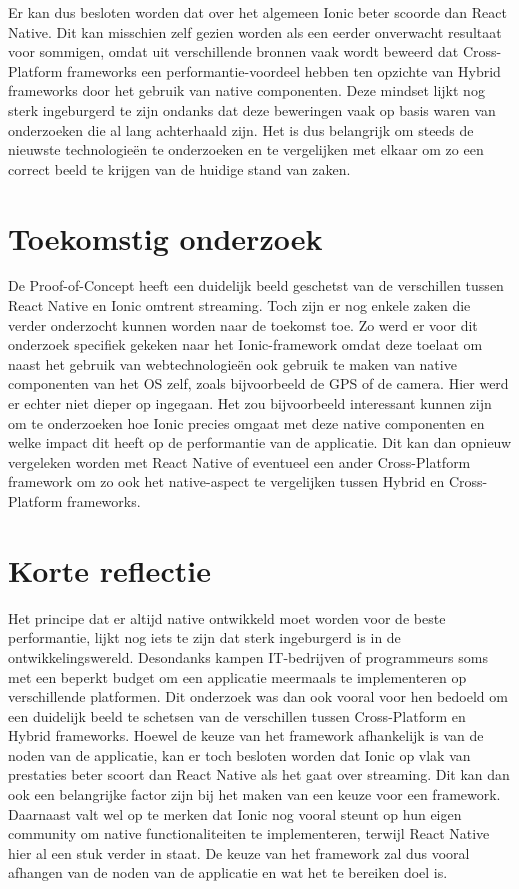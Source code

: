 Er kan dus besloten worden dat over het algemeen Ionic beter scoorde dan React Native. Dit kan misschien zelf gezien worden als een eerder onverwacht resultaat voor sommigen, omdat uit verschillende bronnen vaak wordt beweerd dat Cross-Platform frameworks een performantie-voordeel hebben ten opzichte van Hybrid frameworks door het gebruik van native componenten. Deze mindset lijkt nog sterk ingeburgerd te zijn ondanks dat deze beweringen vaak op basis waren van onderzoeken die al lang achterhaald zijn. Het is dus belangrijk om steeds de nieuwste technologieën te onderzoeken en te vergelijken met elkaar om zo een correct beeld te krijgen van de huidige stand van zaken.

\section{Toekomstig onderzoek}
\label{sec:toekomstig-onderzoek}

De Proof-of-Concept heeft een duidelijk beeld geschetst van de verschillen tussen React Native en Ionic omtrent streaming. Toch zijn er nog enkele zaken die verder onderzocht kunnen worden naar de toekomst toe. Zo werd er voor dit onderzoek specifiek gekeken naar het Ionic-framework omdat deze toelaat om naast het gebruik van webtechnologieën ook gebruik te maken van native componenten van het OS zelf, zoals bijvoorbeeld de GPS of de camera. Hier werd er echter niet dieper op ingegaan. Het zou bijvoorbeeld interessant kunnen zijn om te onderzoeken hoe Ionic precies omgaat met deze native componenten en welke impact dit heeft op de performantie van de applicatie. Dit kan dan opnieuw vergeleken worden met React Native of eventueel een ander Cross-Platform framework om zo ook het native-aspect te vergelijken tussen Hybrid en Cross-Platform frameworks.


\section{Korte reflectie}
\label{sec:korte-reflectie}

Het principe dat er altijd native ontwikkeld moet worden voor de beste performantie, lijkt nog iets te zijn dat sterk ingeburgerd is in de ontwikkelingswereld. Desondanks kampen IT-bedrijven of programmeurs soms met een beperkt budget om een applicatie meermaals te implementeren op verschillende platformen. Dit onderzoek was dan ook vooral voor hen bedoeld om een duidelijk beeld te schetsen van de verschillen tussen Cross-Platform en Hybrid frameworks. Hoewel de keuze van het framework afhankelijk is van de noden van de applicatie, kan er toch besloten worden dat Ionic op vlak van prestaties beter scoort dan React Native als het gaat over streaming. Dit kan dan ook een belangrijke factor zijn bij het maken van een keuze voor een framework. Daarnaast valt wel op te merken dat Ionic nog vooral steunt op hun eigen community om native functionaliteiten te implementeren, terwijl React Native hier al een stuk verder in staat. De keuze van het framework zal dus vooral afhangen van de noden van de applicatie en wat het te bereiken doel is.